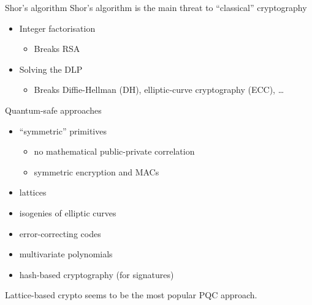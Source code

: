\begin{frame}{Shor's algorithm}
  Shor's algorithm is the main threat to \enquote{classical} cryptography
  \begin{itemize}[<+(1)->]
    \item Integer factorisation
    \begin{itemize}
      \item Breaks RSA
    \end{itemize}
    \item Solving the DLP
    \begin{itemize}
      \item Breaks Diffie-Hellman (DH), elliptic-curve cryptography (ECC), \dots
    \end{itemize}
  \end{itemize}
\end{frame}

\begin{frame}{Quantum-safe approaches}
  \begin{itemize}[<+(1)->]
    \item \enquote{symmetric} primitives
    \begin{itemize}
      \item no mathematical public-private correlation
      \item symmetric encryption and MACs
    \end{itemize}
    \item lattices
    \item isogenies of elliptic curves
    \item error-correcting codes
    \item multivariate polynomials
    \item hash-based cryptography (for signatures)
  \end{itemize}

  \vspace*{1em}

  \pause
  Lattice-based crypto seems to be the most popular PQC approach.
\end{frame}

